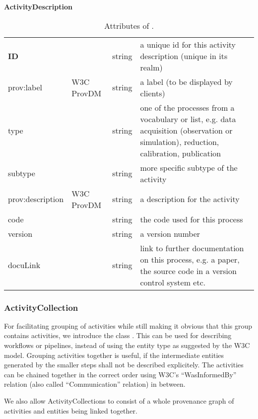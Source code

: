 \begin{table}[ht]
\small
{}\textwidth
\textbf{\normalsize ActivityDescription}\vspace{0.25em}\\
\begin{tabulary}{1.0\textwidth}{@{}lp{2.5cm}lL@{}}
\toprule
{} &  &  & \\
\midrule
\textbf{ID} &   & string & a unique id for this activity description (unique in its realm)\\
prov:label        & W3C ProvDM  & string & a label (to be displayed by clients)\\
type         & & string & one of the processes from a vocabulary or list, e.g. data acquisition (observation or simulation), reduction, calibration, publication\\
subtype  & & string & more specific subtype of the activity\\
prov:description & W3C ProvDM & string & a description for the activity\\
code & & string & the code used for this process\\
version & & string & a version number\\
docuLink & & string & link to further documentation on this process, e.g. a paper, the source code in a version control system etc.\\
\bottomrule
\end{tabulary}
\caption{Attributes of .}
\end{table}


\subsubsection{ActivityCollection}\label{sec:activity-collection}
For facilitating grouping of activities while still making it obvious that this 
group contains activities, we introduce the class .
This can be used for describing workflows or pipelines, instead of using the 
entity type  as suggested by the W3C model.
Grouping activities together is useful, if the intermediate entities generated 
by the smaller steps shall not be described explicitely.
The activities can be chained together in the correct order using 
W3C's ``WasInformedBy'' relation (also called ``Communication'' relation) 
in between.

We also allow ActivityCollections to consist of a whole provenance graph of 
activities and entities being linked together.

